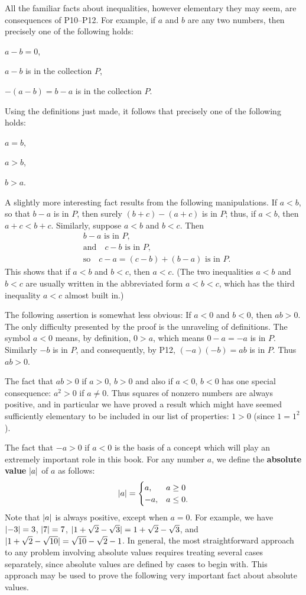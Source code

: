 All the familiar facts about inequalities, however elementary they may seem,
are consequences of P10--P12. For example, if $a$ and $b$ are any two
numbers, then precisely one of the following holds:
\begin{romans}
\item $a - b = 0$,
\item $a - b$ is in the collection $P$,
\item $-(a-b) = b - a$ is in the collection $P$.
\end{romans}
Using the definitions just made, it follows that precisely one of the
following holds:
\begin{romans}
\item $a = b$,
\item $a > b$,
\item $b > a$.
\end{romans}

A slightly more interesting fact results from the following manipulations. If
$a<b$, so that $b-a$ is in $P$, then surely $(b+c)-(a+c)$ is in $P$; thus, if
$a<b$, then $a+c<b+c$. Similarly, suppose $a<b$ and $b<c$. Then
\begin{align*}
&b - a \text{ is in } P,\\
&\text{and}\quad c - b \text{ is in } P,\\
&\text{so}\quad c - a = (c-b)+(b-a) \text{ is in } P.
\end{align*}
This shows that if $a<b$ and $b<c$, then $a<c$. (The two inequalities $a<b$
and $b<c$ are usually written in the abbreviated form $a<b<c$, which has the
third inequality $a<c$ almost built in.)

The following assertion is somewhat less obvious: If $a<0$ and $b<0$, then
$ab>0$. The only difficulty presented by the proof is the unraveling of
definitions. The symbol $a<0$ means, by definition, $0>a$, which means
$0-a=-a$ is in $P$. Similarly $-b$ is in $P$, and consequently, by P12,
$(-a)(-b)=ab$ is in $P$. Thus $ab>0$.

The fact that $ab>0$ if $a>0$, $b>0$ and also if $a<0$, $b<0$ has one special
consequence: $a^2>0$ if $a\neq 0$. Thus squares of nonzero numbers are always
positive, and in particular we have proved a result which might have seemed
sufficiently elementary to be included in our list of properties: $1>0$ (since
$1=1^2$).

The fact that $-a>0$ if $a<0$ is the basis of a concept which will play an
extremely important role in this book. For any number $a$, we define the
\textbf{absolute value} $\lvert a\rvert$ of $a$ as follows:
\[
\lvert a\rvert =
\begin{cases}
a, & a \geq 0\\
-a, & a \leq 0.
\end{cases}
\]
Note that $\lvert a\rvert$ is always positive, except when $a=0$. For example, we have
$\lvert-3\rvert=3$, $\lvert7\rvert=7$, $\lvert1+\sqrt{2}-\sqrt{3}\rvert = 1+\sqrt{2}-\sqrt{3}$,
and $\lvert1+\sqrt{2}-\sqrt{10}\rvert = \sqrt{10}-\sqrt{2}-1$. In general, the most
straightforward approach to any problem involving absolute values requires
treating several cases separately, since absolute values are defined by cases
to begin with. This approach may be used to prove the following very
important fact about absolute values.

